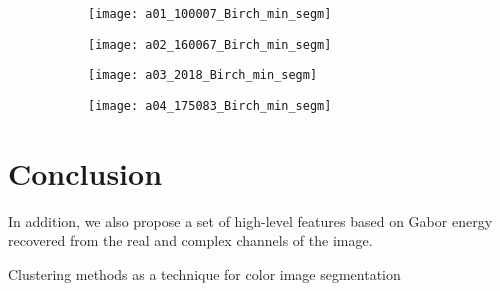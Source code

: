 \begin{figure}[!ht]
    
    \begin{subfigure}[t]{\textwidth+20pt\relax}
    	\centering
    	\texttt{[image: a01\_100007\_Birch\_min\_segm]} 
    \end{subfigure}      
    \begin{subfigure}[b]{0.23\textwidth}
    	\centering
        \texttt{[image: a02\_160067\_Birch\_min\_segm]}
    \end{subfigure}
    \begin{subfigure}[b]{0.23\textwidth}
    	\centering
        \texttt{[image: a03\_2018\_Birch\_min\_segm]}
    \end{subfigure}
    \begin{subfigure}[b]{0.23\textwidth}
    	\centering
        \texttt{[image: a04\_175083\_Birch\_min\_segm]}
    \end{subfigure} 
    
	\caption{}\label{fig:BSD_clustering _results}    
\end{figure}

\section{Conclusion}
In addition, we also propose a set of high-level features based on Gabor energy recovered from the real and complex channels of the image.

Clustering methods as a technique for color image segmentation